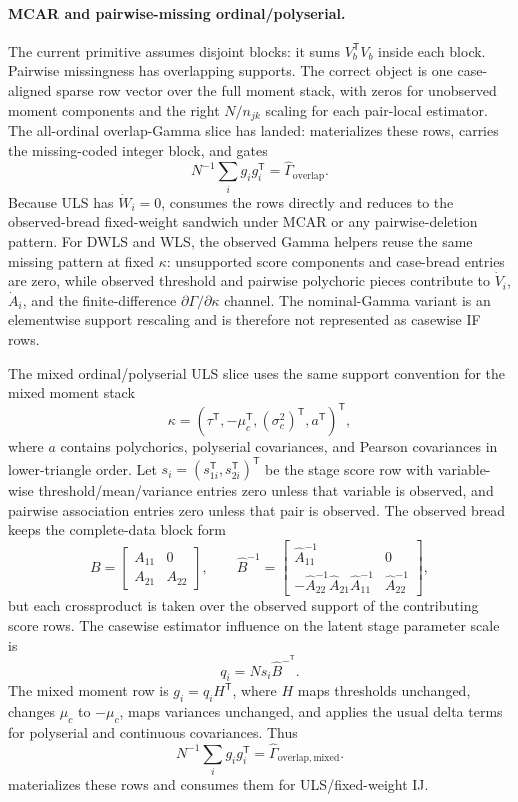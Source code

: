 \documentclass[11pt]{article}
\newcommand{\T}{^{\mathsf T}}
\theoremstyle{plain}
\theoremstyle{remark}
\begin{document}
\paragraph{MCAR and pairwise-missing ordinal/polyserial.}
The current primitive assumes disjoint blocks: it sums $V_b\T V_b$ inside each
block. Pairwise missingness has overlapping supports. The correct object is one
case-aligned sparse row vector over the full moment stack, with zeros for
unobserved moment components and the right $N/n_{jk}$ scaling for each
pair-local estimator. The all-ordinal overlap-Gamma slice has landed:
 materializes
these rows, carries the missing-coded integer block, and gates
\[
  N^{-1}\sum_i g_i g_i\T = \widehat\Gamma_{\mathrm{overlap}} .
\]
Because ULS has $\dot W_i=0$,  consumes the rows
directly and reduces to the observed-bread fixed-weight sandwich under MCAR or
any pairwise-deletion pattern. For DWLS and WLS, the observed Gamma helpers
reuse the same missing pattern at fixed $\kappa$: unsupported score components
and case-bread entries are zero, while observed threshold and pairwise
polychoric pieces contribute to $\dot V_i$, $\dot A_i$, and the
finite-difference $\partial\Gamma/\partial\kappa$ channel. The nominal-Gamma
variant is an elementwise support rescaling and is therefore not represented as
casewise IF rows.

The mixed ordinal/polyserial ULS slice uses the same support convention for the
mixed moment stack
\[
  \kappa =
  (\tau\T,-\mu_c\T,(\sigma_c^2)\T, a\T)\T ,
\]
where $a$ contains polychorics, polyserial covariances, and Pearson
covariances in lower-triangle order. Let $s_i=(s_{1i}\T,s_{2i}\T)\T$ be the
stage score row with variable-wise threshold/mean/variance entries zero unless
that variable is observed, and pairwise association entries zero unless that
pair is observed. The observed bread keeps the complete-data block form
\[
  B =
  \begin{bmatrix}
    A_{11} & 0\\
    A_{21} & A_{22}
  \end{bmatrix},
  \qquad
  \hat B^{-1} =
  \begin{bmatrix}
    \hat A_{11}^{-1} & 0\\
    -\hat A_{22}^{-1}\hat A_{21}\hat A_{11}^{-1}
      & \hat A_{22}^{-1}
  \end{bmatrix},
\]
but each crossproduct is taken over the observed support of the contributing
score rows. The casewise estimator influence on the latent stage parameter
scale is
\[
  q_i = N s_i \hat B^{-\T}.
\]
The mixed moment row is $g_i=q_iH\T$, where $H$ maps thresholds unchanged,
changes $\mu_c$ to $-\mu_c$, maps variances unchanged, and applies the usual
delta terms for polyserial and continuous covariances. Thus
\[
  N^{-1}\sum_i g_i g_i\T = \widehat\Gamma_{\mathrm{overlap,mixed}} .
\]
 materializes these rows and
 consumes them for ULS/fixed-weight IJ.
\end{document}
